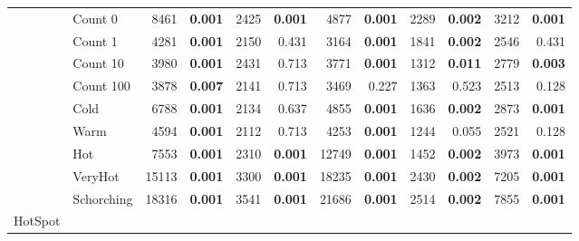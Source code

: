 \begin{table*}
{\begin{tabular}{cl|rr|rr|rr|rr|rr|}
                & Count 0      & 8461                    & \bf 0.001                  & 2425                      & \bf 0.001                     & 4877                   & \bf 0.001    & 2289      & \bf 0.002    & 3212       & \bf 0.001    \\
                & Count 1      & 4281                    & \bf 0.001                  & 2150                      & 0.431                         & 3164                   & \bf 0.001    & 1841      & \bf 0.002    & 2546       & 0.431        \\
                & Count 10     & 3980                    & \bf 0.001                  & 2431                      & 0.713                         & 3771                   & \bf 0.001    & 1312      & \bf 0.011    & 2779       & \bf  0.003   \\
                & Count 100    & 3878                    & \bf 0.007                  & 2141                      & 0.713                         & 3469                   & 0.227        & 1363      & 0.523        & 2513       & 0.128        \\
                & Cold         & 6788                    & \bf 0.001                  & 2134                      & 0.637                         & 4855                   & \bf 0.001    & 1636      & \bf 0.002    & 2873       & \bf  0.001   \\
                & Warm         & 4594                    & \bf 0.001                  & 2112                      & 0.713                         & 4253                   & \bf 0.001    & 1244      & 0.055        & 2521       & 0.128        \\
                & Hot          & 7553                    & \bf 0.001                  & 2310                      & \bf 0.001                     & 12749                  & \bf 0.001    & 1452      & \bf 0.002    & 3973       & \bf 0.001    \\
                & VeryHot      & 15113                   & \bf 0.001                  & 3300                      & \bf 0.001                     & 18235                  & \bf 0.001    & 2430      & \bf 0.002    & 7205       & \bf 0.001    \\
                & Schorching   & 18316                   & \bf 0.001                  & 3541                      & \bf 0.001                     & 21686                  & \bf 0.001    & 2514      & \bf 0.002    & 7855       & \bf 0.001    \\
            \hline
            \multirow{5}{*}{\sc HotSpot}

\end{tabular}}
\end{table*}
